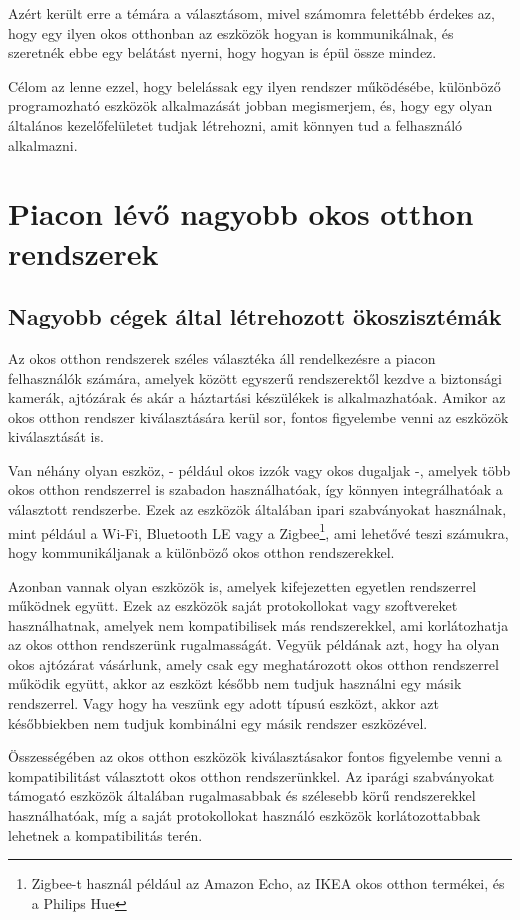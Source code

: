 \documentclass[
]{thesis-ekf}
\theoremstyle{definition}
\theoremstyle{remark}
\begin{document}
	Azért került erre a témára a választásom, mivel számomra felettébb érdekes az, hogy egy ilyen okos otthonban az eszközök hogyan is kommunikálnak, és szeretnék ebbe egy belátást nyerni, hogy hogyan is épül össze mindez.

	Célom az lenne ezzel, hogy belelássak egy ilyen rendszer működésébe, különböző programozható eszközök alkalmazását jobban megismerjem, és, hogy egy olyan általános kezelőfelületet tudjak létrehozni, amit könnyen tud a felhasználó alkalmazni.
	
	\chapter{Piacon lévő nagyobb okos otthon rendszerek}
	\section{Nagyobb cégek által létrehozott ökoszisztémák}
	Az okos otthon rendszerek széles választéka áll rendelkezésre a piacon felhasználók számára, amelyek között egyszerű rendszerektől kezdve a biztonsági kamerák, ajtózárak és akár a háztartási készülékek is alkalmazhatóak. Amikor az okos otthon rendszer kiválasztására kerül sor, fontos figyelembe venni az eszközök kiválasztását is.
	
	Van néhány olyan eszköz, - például okos izzók vagy okos dugaljak -, amelyek több okos otthon rendszerrel is szabadon használhatóak, így könnyen integrálhatóak a választott rendszerbe. Ezek az eszközök általában ipari szabványokat használnak, mint például a Wi-Fi, Bluetooth LE vagy a Zigbee\footnote{Zigbee-t használ például az Amazon Echo, az IKEA okos otthon termékei, és a Philips Hue}, ami lehetővé teszi számukra, hogy kommunikáljanak a különböző okos otthon rendszerekkel. 
	
	Azonban vannak olyan eszközök is, amelyek kifejezetten egyetlen rendszerrel működnek együtt. Ezek az eszközök saját protokollokat vagy szoftvereket használhatnak, amelyek nem kompatibilisek más rendszerekkel, ami korlátozhatja az okos otthon rendszerünk rugalmasságát. Vegyük példának azt, hogy ha olyan okos ajtózárat vásárlunk, amely csak egy meghatározott okos otthon rendszerrel működik együtt, akkor az eszközt később nem tudjuk használni egy másik rendszerrel. Vagy hogy ha veszünk egy adott típusú eszközt, akkor azt későbbiekben nem tudjuk kombinálni egy másik rendszer eszközével.
	
	Összességében az okos otthon eszközök kiválasztásakor fontos figyelembe venni a kompatibilitást választott okos otthon rendszerünkkel. Az iparági szabványokat támogató eszközök általában rugalmasabbak és szélesebb körű rendszerekkel használhatóak, míg a saját protokollokat használó eszközök korlátozottabbak lehetnek a kompatibilitás terén.
		
\end{document}
